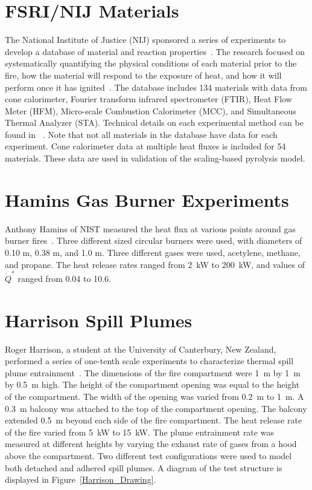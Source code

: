 \section{FSRI/NIJ Materials}
\label{FSRI_NIJ_Description}

The National Institute of Justice (NIJ) sponsored a series of experiments to develop a database of material and reaction properties~\cite{McKinnon:FSRI2023_Data}.
The research focused on systematically quantifying the physical conditions of each material prior to the fire, how the material will respond to the exposure of heat, and how it will perform once it has ignited~\cite{McKinnon:FSRI2023_User}.
The database includes 134 materials with data from cone calorimeter, Fourier transform infrared spectrometer (FTIR), Heat Flow Meter (HFM), Micro-scale Combustion Calorimeter (MCC), and Simultaneous Thermal Analyzer (STA). 
Technical details on each experimental method can be found in ~\cite{McKinnon:FSRI2023_Tech}.
Note that not all materials in the database have data for each experiment. 
Cone calorimeter data at multiple heat fluxes is included for 54 materials.
These data are used in validation of the scaling-based pyrolysis model.


\section{Hamins Gas Burner Experiments}
\label{Hamins_Gas_Burner_Description}

Anthony Hamins of NIST measured the heat flux at various points around gas burner fires~\cite{Hostikka:3}. Three different sized circular burners were used, with diameters of 0.10 m, 0.38 m, and 1.0 m. Three different gases were used, acetylene, methane, and propane. The heat release rates ranged from 2~kW to 200~kW, and values of $\dot{Q}^*$ ranged from 0.04 to 10.6.


\section{Harrison Spill Plumes}
\label{Harrison_Spill_Plumes_Description}

Roger Harrison, a student at the University of Canterbury, New Zealand, performed a series of one-tenth scale experiments to characterize thermal spill plume entrainment~\cite{Harrison:2009,Harrison:IAFSS2008,Harrison:FT2007,Harrison:FSJ2010}. The dimensions of the fire compartment were 1~m by 1~m by 0.5~m high.  The height of the compartment opening was equal to the height of the compartment. The width of the opening was varied from 0.2~m to 1~m.  A 0.3~m balcony was attached to the top of the compartment opening. The balcony extended 0.5~m beyond each side of the fire compartment.  The heat release rate of the fire varied from 5~kW to 15~kW.
The plume entrainment rate was measured at different heights by varying the exhaust rate of gases from a hood above the compartment.
Two different test configurations were used to model both detached and adhered spill plumes. A diagram of the test structure is displayed in Figure~\ref{Harrison_Drawing}.


